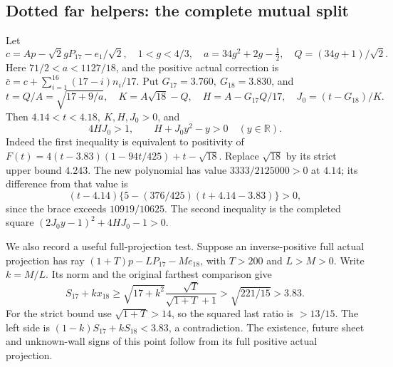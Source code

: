 \documentclass[11pt]{article}
\theoremstyle{definition}
\theoremstyle{remark}
\begin{document}
\subsection{Dotted far helpers: the complete mutual split}
\label{app:B18dottedfar}
Let
\[
 c=Ap-\sqrt2gP_{17}-e_1/\sqrt2,\quad
 1<g<4/3,\quad a=34g^2+2g-\tfrac12,\quad
 Q=(34g+1)/\sqrt2 .
\]
Here \(71/2<a<1127/18\), and the positive actual correction is
\(\bar c=c+\sum_{i=1}^{16}(17-i)n_i/17\).
Put \(G_{17}=3.760,\ G_{18}=3.830\), and
\[
 t=Q/A=\sqrt{17+9/a},\quad K=A\sqrt{18}-Q,\quad
 H=A-G_{17}Q/17,\quad
 J_0=(t-G_{18})/K.
\]
Then \(4.14<t<4.18,\ K,H,J_0>0\), and
\begin{equation}\label{eq:B18quadraticframe}
 4HJ_0>1,\qquad H+J_0y^2-y>0\quad(y\in\mathbb R).
\end{equation}
Indeed the first inequality is equivalent to positivity of
\(F(t)=4(t-3.83)(1-94t/425)+t-\sqrt{18}\).
Replace \(\sqrt{18}\) by its strict upper bound \(4.243\).
The new polynomial has value \(3333/2125000>0\) at \(4.14\);
its difference from that value is
\[
 (t-4.14)\{5-(376/425)(t+4.14-3.83)\}>0,
\]
since the brace exceeds \(10919/10625\). The second inequality
is the completed square
\((2J_0y-1)^2+4HJ_0-1>0\).

We also record a useful full-projection test.
Suppose an inverse-positive full actual projection has ray
\((1+T)p-LP_{17}-Me_{18}\), with \(T>200\) and \(L>M>0\).
Write \(k=M/L\). Its norm and the original farthest comparison give
\[
 S_{17}+kx_{18}\geq
 \sqrt{17+k^2}\frac{\sqrt T}{\sqrt{1+T}+1}
 >\sqrt{221/15}>3.83.
\]
For the strict bound use \(\sqrt{1+T}>14\), so the squared
last ratio is \(>13/15\). The left side is
\((1-k)S_{17}+kS_{18}<3.83\), a contradiction.
The existence, future sheet and unknown-wall signs of this point
follow from its full positive actual projection.
\end{document}
